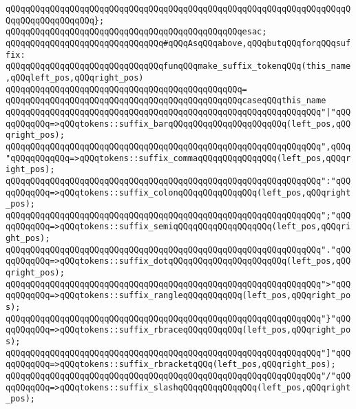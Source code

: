 \verb|qQQqqQQqqQQqqQQqqQQqqQQqqQQqqQQqqQQqqQQqqQQqqQQqqQQqqQQqqQQqqQQqqQQqqQQqqQQqqQQqqQQqqQQq};|\newline
\verb|qQQqqQQqqQQqqQQqqQQqqQQqqQQqqQQqqQQqqQQqqQQqqQQqesac;|\newline
\newline
\verb|qQQqqQQqqQQqqQQqqQQqqQQqqQQqqQQq#qQQqAsqQQqabove,qQQqbutqQQqforqQQqsuffix:|\newline
\newline
\verb|qQQqqQQqqQQqqQQqqQQqqQQqqQQqqQQqfunqQQqmake_suffix_tokenqQQq(this_name,qQQqleft_pos,qQQqright_pos)|\newline
\verb|qQQqqQQqqQQqqQQqqQQqqQQqqQQqqQQqqQQqqQQqqQQqqQQq=|\newline
\verb|qQQqqQQqqQQqqQQqqQQqqQQqqQQqqQQqqQQqqQQqqQQqqQQqcaseqQQqthis_name|\newline
\newline
\verb|qQQqqQQqqQQqqQQqqQQqqQQqqQQqqQQqqQQqqQQqqQQqqQQqqQQqqQQqqQQqqQQq"|\verb#|"qQQqqQQqqQQq=>qQQqtokens::suffix_barqQQqqQQqqQQqqQQqqQQqqQQq(left_pos,qQQqright_pos);#\newline
\verb|qQQqqQQqqQQqqQQqqQQqqQQqqQQqqQQqqQQqqQQqqQQqqQQqqQQqqQQqqQQqqQQq",qQQq"qQQqqQQqqQQq=>qQQqtokens::suffix_commaqQQqqQQqqQQqqQQq(left_pos,qQQqright_pos);|\newline
\verb|qQQqqQQqqQQqqQQqqQQqqQQqqQQqqQQqqQQqqQQqqQQqqQQqqQQqqQQqqQQqqQQq":"qQQqqQQqqQQq=>qQQqtokens::suffix_colonqQQqqQQqqQQqqQQq(left_pos,qQQqright_pos);|\newline
\verb|qQQqqQQqqQQqqQQqqQQqqQQqqQQqqQQqqQQqqQQqqQQqqQQqqQQqqQQqqQQqqQQq";"qQQqqQQqqQQq=>qQQqtokens::suffix_semiqQQqqQQqqQQqqQQqqQQq(left_pos,qQQqright_pos);|\newline
\verb|qQQqqQQqqQQqqQQqqQQqqQQqqQQqqQQqqQQqqQQqqQQqqQQqqQQqqQQqqQQqqQQq"."qQQqqQQqqQQq=>qQQqtokens::suffix_dotqQQqqQQqqQQqqQQqqQQqqQQq(left_pos,qQQqright_pos);|\newline
\verb|qQQqqQQqqQQqqQQqqQQqqQQqqQQqqQQqqQQqqQQqqQQqqQQqqQQqqQQqqQQqqQQq">"qQQqqQQqqQQq=>qQQqtokens::suffix_rangleqQQqqQQqqQQq(left_pos,qQQqright_pos);|\newline
\verb|qQQqqQQqqQQqqQQqqQQqqQQqqQQqqQQqqQQqqQQqqQQqqQQqqQQqqQQqqQQqqQQq"}"qQQqqQQqqQQq=>qQQqtokens::suffix_rbraceqQQqqQQqqQQq(left_pos,qQQqright_pos);|\newline
\verb|qQQqqQQqqQQqqQQqqQQqqQQqqQQqqQQqqQQqqQQqqQQqqQQqqQQqqQQqqQQqqQQq"]"qQQqqQQqqQQq=>qQQqtokens::suffix_rbracketqQQq(left_pos,qQQqright_pos);|\newline
\verb|qQQqqQQqqQQqqQQqqQQqqQQqqQQqqQQqqQQqqQQqqQQqqQQqqQQqqQQqqQQqqQQq"/"qQQqqQQqqQQq=>qQQqtokens::suffix_slashqQQqqQQqqQQqqQQq(left_pos,qQQqright_pos);|\newline
